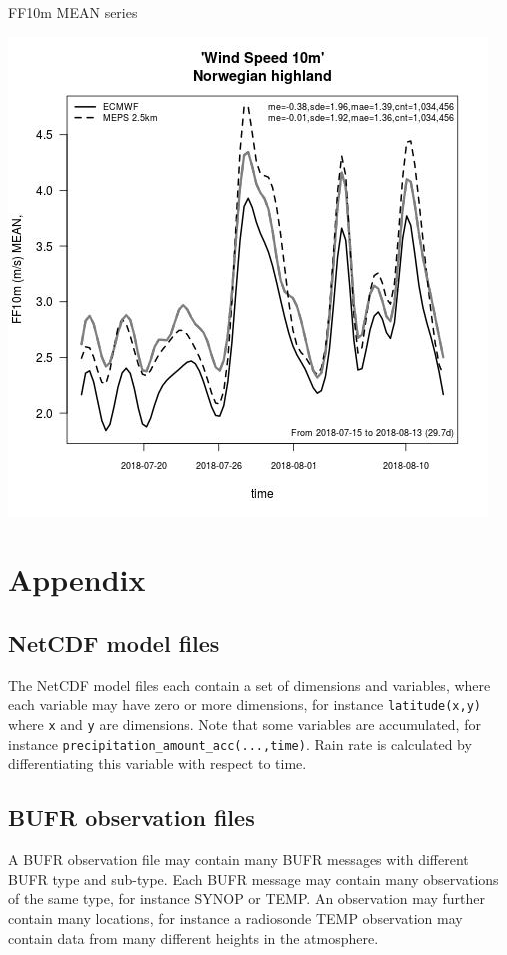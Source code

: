 \documentclass[letterpaper,10pt,twoside,twocolumn,openany]{book}
\begin{document}
{\begin{paperbox}{FF10m MEAN series}
  \centerline{\includegraphics[width=0.85\columnwidth]{ff10m_time_hl.jpg}}
\end{paperbox}


\newpage
\hypertarget{appendix}{}
\section{Appendix}
\hypertarget{netcdf}{}
\subsection{NetCDF model files}
The NetCDF model files each contain a set of dimensions and variables, 
where each variable may have zero or more dimensions, for instance \lstinline!latitude(x,y)! where
\lstinline!x! and \lstinline!y! are dimensions. 
Note that some variables are accumulated, for instance \lstinline!precipitation_amount_acc(...,time)!. 
Rain rate is calculated by differentiating this variable with respect to time.

\hypertarget{bufr}{}
\subsection{BUFR observation files}
A BUFR observation file may contain many BUFR messages with different BUFR type and sub-type.
Each BUFR message may contain many observations of the same type, for instance SYNOP or TEMP. 
An observation may further contain many locations, for instance a radiosonde TEMP 
observation may contain data from many different heights in the atmosphere.


}
\end{document}

